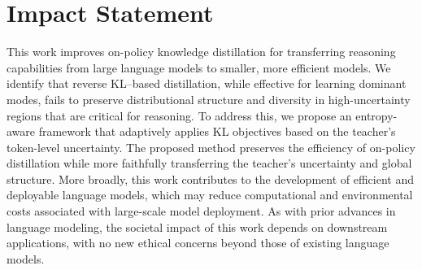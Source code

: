 \documentclass{article}
\theoremstyle{plain}
\theoremstyle{definition}
\theoremstyle{remark}
\newcommand{\methodfullname}{Entropy-Aware On-Policy Distillation}
\begin{document}
\begin{abstract}
\end{abstract}








%


\section*{Impact Statement}
This work improves on-policy knowledge distillation for transferring reasoning capabilities from large language models to smaller, more efficient models. We identify that reverse KL–based distillation, while effective for learning dominant modes, fails to preserve distributional structure and diversity in high-uncertainty regions that are critical for reasoning. To address this, we propose an entropy-aware framework that adaptively applies KL objectives based on the teacher’s token-level uncertainty. The proposed method preserves the efficiency of on-policy distillation while more faithfully transferring the teacher’s uncertainty and global structure. More broadly, this work contributes to the development of efficient and deployable language models, which may reduce computational and environmental costs associated with large-scale model deployment. As with prior advances in language modeling, the societal impact of this work depends on downstream applications, with no new ethical concerns beyond those of existing language models.


\end{document}
